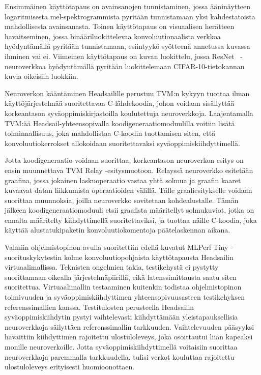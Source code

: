 \documentclass[12pt,a4paper,finnish
]{tunithesis}
\begin{document}
Ensimmäinen käyttötapaus on avainsanojen tunnistaminen, jossa ääninäytteen logaritmisesta mel-spektrogrammista pyritään tunnistamaan yksi kahdestatoista mahdollisesta avainsanasta.
Toinen käyttötapaus on visuaalisen herätteen havaitseminen, jossa binääriluokittelevaa konvoluutionaalista verkkoa hyödyntämällä pyritään tunnistamaan, esiintyykö syötteenä annetussa kuvassa ihminen vai ei.
Viimeinen käyttötapaus on kuvan luokittelu, jossa ResNet~\cite{he_deep_2015} -neuroverkkoa hyödyntämällä pyritään luokittelemaan CIFAR-10-tietokannan kuvia oikeisiin luokkiin.

Neuroverkon kääntäminen Headsailille perustuu TVM:n kykyyn tuottaa ilman käyttöjärjestelmää suoritettavaa C-lähdekoodia, johon voidaan sisällyttää korkeantason syväoppimiskirjastoilla koulutettuja neuroverkkoja. Laajentamalla TVM:ää Headsail-yhteensopivalla koodigeneraatiomoduulilla voitiin lisätä toiminnallisuus, joka mahdollistaa C-koodin tuottamisen siten, että konvoluutiokerrokset allokoidaan suoritettavaksi syväoppimiskiihdyttimellä.

Jotta koodigeneraatio voidaan suorittaa, korkeantason neuroverkon esitys on ensin muunnettava TVM Relay -esitysmuotoon.
Relayssä neuroverkko esitetään graafina, jossa jokainen laskuoperaatio vastaa yhtä solmua ja graafin kaaret kuvaavat datan liikkumista operaatioiden välillä.
Tälle graafiesitykselle voidaan suorittaa muunnoksia, joilla neuroverkko sovitetaan kohdealustalle.
Tämän jälkeen koodigeneraatiomoduuli etsii graafista määritellyt solmukuviot, jotka on ennalta määritelty kiihdyttimellä suoritettaviksi, ja tuottaa näille C-koodia, joka käyttää alustatukipaketin konvoluutiokomentoja päätelaskennan aikana.

Valmiin ohjelmistopinon avulla suoritettiin edellä kuvatut MLPerf Tiny -suo\-ri\-tus\-ky\-ky\-tes\-tin kolme konvoluutiopohjaista käyttötapausta Headsailin virtuaalimallissa.
Teknisten ongelmien takia, testikehystä ei pystytty suorittamaan oikealla jär\-jes\-tel\-mä\-pii\-ri\-llä, eikä latenssimittausta saatu siten suoritettua. Virtuaalimallin testaaminen kuitenkin todistaa ohjelmistopinon toimivuuden ja sy\-vä\-op\-pi\-mis\-kiih\-dy\-tti\-men yhteensopivuusasteen testikehyksen referenssimallien kanssa.
Testitulosten perusteella Headsailin sy\-vä\-op\-pi\-mis\-kiih\-dy\-tin pystyi vaihtelevasti kiihdyttämään yleistapauksellisia neuroverkkoja säilyttäen referenssimallin tarkkuuden.
Vaihtelevuuden pääsyyksi havaittiin kiihdyttimen rajoitettu ulostuloleveys, joka osoittautui liian kapeaksi monille neuroverkoille.
Jotta syväoppimiskiihdyttimellä voitaisiin suorittaa neuroverkkoja paremmalla tarkkuudella, tulisi verkot kouluttaa rajoitettu ulostuloleveys erityisesti huomioonottaen.




%
%
\newpage

\printbibliography[title=Lähteet]


%
\end{document}
